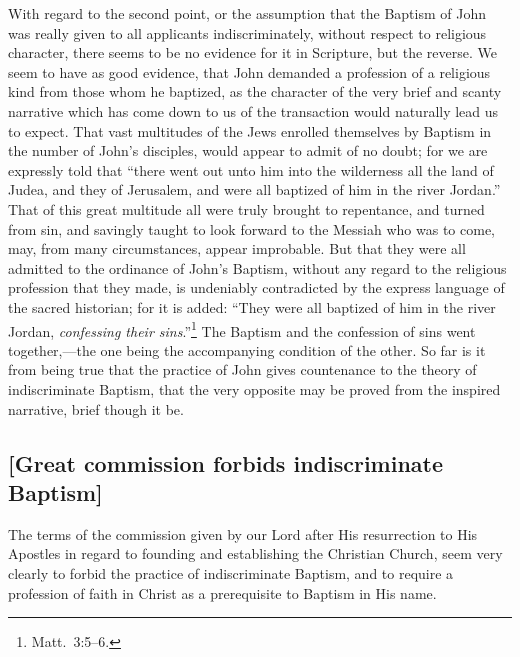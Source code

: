 \documentclass[
  english,
]{book}
\begin{document}
With regard to the second point, or the assumption that the Baptism of John was really given to all applicants indiscriminately, without respect to religious character, there seems to be no evidence for it in Scripture, but the reverse. We seem to have as good evidence, that John demanded a profession of a religious kind from those whom he baptized, as the character of the very brief and scanty narrative which has come down to us of the transaction would naturally lead us to expect. That vast multitudes of the Jews enrolled themselves by Baptism in the number of John's disciples, would appear to admit of no doubt; for we are expressly told that ``there went out unto him into the wilderness all the land of Judea, and they of Jerusalem, and were all baptized of him in the river Jordan.'' That of this great multitude all were truly brought to repentance, and turned from sin, and savingly taught to look forward to the Messiah who was to come, may, from many circumstances, appear improbable. But that they were all admitted to the ordinance of John's Baptism, without any regard to the religious profession that they made, is undeniably contradicted by the express language of the sacred historian; for it is added: ``They were all baptized of him in the river Jordan, \emph{confessing their sins}.''\footnote{Matt.~3:5--6.} The Baptism and the confession of sins went together,---the one being the accompanying condition of the other. So far is it from being true that the practice of John gives countenance to the theory of indiscriminate Baptism, that the very opposite may be proved from the inspired narrative, brief though it be.

\hypertarget{great-commission-forbids-indiscriminate-baptism}{%
\subsection{{[}Great commission forbids indiscriminate Baptism{]}}\label{great-commission-forbids-indiscriminate-baptism}}

The terms of the commission given by our Lord after His resurrection to His Apostles in regard to founding and establishing the Christian Church, seem very clearly to forbid the practice of indiscriminate Baptism, and to require a profession of faith in Christ as a prerequisite to Baptism in His name.
\end{document}

